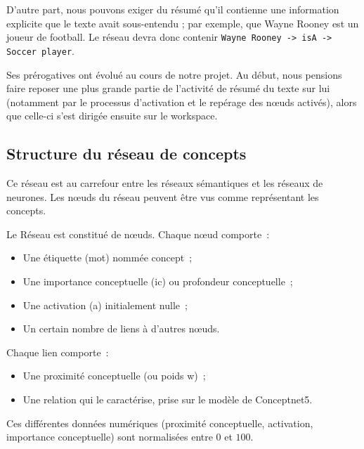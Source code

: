 \documentclass[a4paper, 12pt]{article}
\begin{document}
D'autre part, nous pouvons exiger du résumé qu'il contienne une information explicite que le texte avait sous-entendu ; par exemple, que Wayne Rooney est un joueur de football. Le réseau devra donc contenir \verb|Wayne Rooney -> isA -> Soccer player|.

Ses prérogatives ont évolué au cours de notre projet. Au début, nous pensions faire reposer une plus grande partie de l'activité de résumé du texte sur lui (notamment par le processus d'activation et le repérage des nœuds activés), alors que celle-ci s'est dirigée ensuite sur le workspace.


\subsection{Structure du réseau de concepts}

\begin{definition}
Ce réseau est au carrefour entre les réseaux sémantiques et les réseaux de neurones. Les nœuds du réseau peuvent être vus comme représentant les concepts.
\end{definition}

Le Réseau est constitué de n\oe{}uds. Chaque n\oe{}ud comporte~:
\begin{itemize}
  \item Une étiquette (mot) nommée concept~;
 \item Une importance conceptuelle (ic) ou profondeur conceptuelle~;
 \item Une activation (a) initialement nulle~;
 \item Un certain nombre de liens à d'autres n\oe{}uds.
\end{itemize}

Chaque lien comporte~:
\begin{itemize}
 \item Une proximité conceptuelle (ou poids w)~;
 \item Une relation qui le caractérise, prise sur le modèle de Conceptnet5.
\end{itemize}

Ces différentes données numériques (proximité conceptuelle, activation, importance conceptuelle) sont normalisées entre $0$ et $100$.
\end{document}
